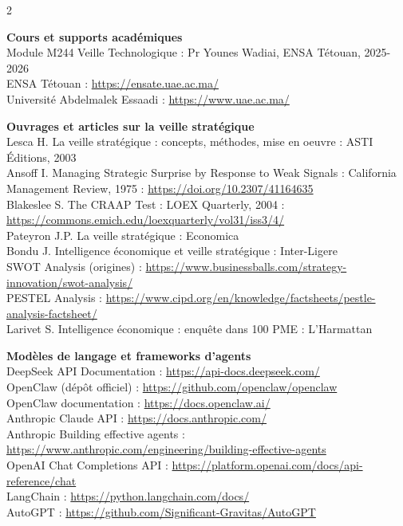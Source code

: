 \documentclass[12pt,a4paper,openany]{report}
\begin{document}
\vspace{0.4cm}

\begin{multicols}{2}
\raggedright
\sffamily\small

\textbf{\color{ensaBlue}Cours et supports académiques}\\
Module M244 Veille Technologique : Pr Younes Wadiai, ENSA Tétouan, 2025-2026\\
ENSA Tétouan : \url{https://ensate.uae.ac.ma/}\\
Université Abdelmalek Essaadi : \url{https://www.uae.ac.ma/}

\vspace{0.3cm}

\textbf{\color{ensaBlue}Ouvrages et articles sur la veille stratégique}\\
Lesca H. \og La veille stratégique : concepts, méthodes, mise en oeuvre \fg{} : ASTI Éditions, 2003\\
Ansoff I. \og Managing Strategic Surprise by Response to Weak Signals \fg{} : California Management Review, 1975 : \url{https://doi.org/10.2307/41164635}\\
Blakeslee S. \og The CRAAP Test \fg{} : LOEX Quarterly, 2004 : \url{https://commons.emich.edu/loexquarterly/vol31/iss3/4/}\\
Pateyron J.P. \og La veille stratégique \fg{} : Economica\\
Bondu J. \og Intelligence économique et veille stratégique \fg{} : Inter-Ligere\\
SWOT Analysis (origines) : \url{https://www.businessballs.com/strategy-innovation/swot-analysis/}\\
PESTEL Analysis : \url{https://www.cipd.org/en/knowledge/factsheets/pestle-analysis-factsheet/}\\
Larivet S. \og Intelligence économique : enquête dans 100 PME \fg{} : L'Harmattan

\vspace{0.3cm}

\textbf{\color{ensaBlue}Modèles de langage et frameworks d'agents}\\
DeepSeek API Documentation : \url{https://api-docs.deepseek.com/}\\
OpenClaw (dépôt officiel) : \url{https://github.com/openclaw/openclaw}\\
OpenClaw documentation : \url{https://docs.openclaw.ai/}\\
Anthropic Claude API : \url{https://docs.anthropic.com/}\\
Anthropic \og Building effective agents \fg{} : \url{https://www.anthropic.com/engineering/building-effective-agents}\\
OpenAI Chat Completions API : \url{https://platform.openai.com/docs/api-reference/chat}\\
LangChain : \url{https://python.langchain.com/docs/}\\
AutoGPT : \url{https://github.com/Significant-Gravitas/AutoGPT}


\end{multicols}
\end{document}
